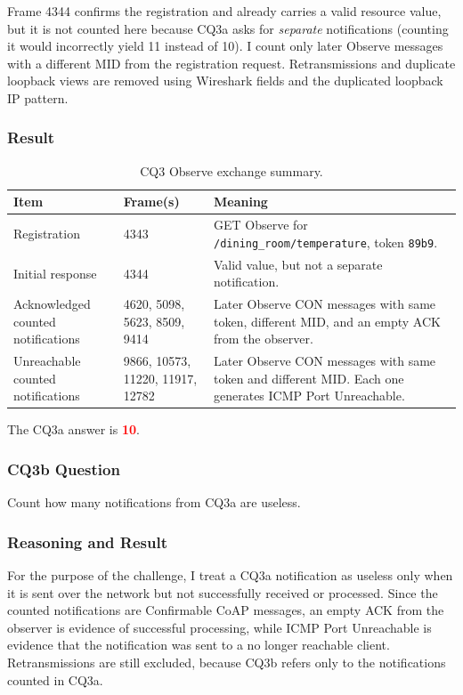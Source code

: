 \documentclass[a4paper,11pt]{article}
\newcommand{\answer}[1]{\textbf{\textcolor{red}{#1}}}
\newcommand{\code}[1]{\texttt{#1}}
\begin{document}
Frame 4344 confirms the registration and already carries a valid resource value, but
it is not counted here because CQ3a asks for \emph{separate} notifications (counting
it would incorrectly yield 11 instead of 10). I count only later Observe messages 
with a different MID from the registration request.
Retransmissions and duplicate loopback views are removed using Wireshark fields and
the duplicated loopback IP pattern.

\subsubsection{Result}
\begin{table}[H]
\centering
\caption{CQ3 Observe exchange summary.}
\begin{tabularx}{\textwidth}{@{}l p{4.2cm} X@{}}
\toprule
Item & Frame(s) & Meaning \\
\midrule
Registration & 4343 & GET Observe for \code{/dining\_room/\allowbreak temperature}, token \code{89b9}. \\
Initial response & 4344 & Valid value, but not a separate notification. \\
Acknowledged counted notifications & 4620, 5098, 5623, 8509, 9414 & Later Observe CON messages with same token, different MID, and an empty ACK from the observer. \\
Unreachable counted notifications & 9866, 10573, 11220, 11917, 12782 & Later Observe CON messages with same token and different MID. Each one generates ICMP Port Unreachable. \\
\bottomrule
\end{tabularx}
\end{table}

The CQ3a answer is \answer{10}.

\subsubsection{CQ3b Question}
Count how many notifications from CQ3a are useless.

\subsubsection{Reasoning and Result}
For the purpose of the challenge, I treat a CQ3a notification as useless only when
it is sent over the network but not successfully received or processed. Since the
counted notifications are Confirmable CoAP messages, an empty ACK from the observer
is evidence of successful processing, while ICMP Port Unreachable is evidence that
the notification was sent to a no longer reachable client. Retransmissions are
still excluded, because CQ3b refers only to the notifications counted in CQ3a.
\end{document}
